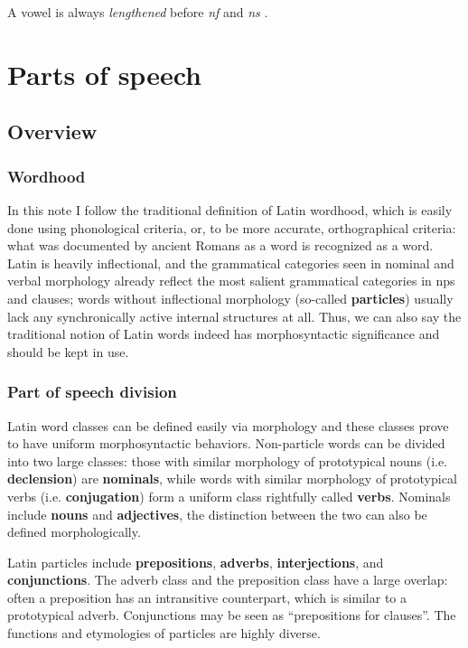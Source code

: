 \documentclass[a4paper, oneside, 12pt]{report}
\newcommand*{\citepage}[1]{p.~{#1}}
\newcommand*{\concept}[1]{\textbf{#1}}
\newcommand{\form}[1]{\emph{#1}}
\begin{document}
A vowel is always \emph{lengthened} before \form{nf} and \form{ns}
\citep[\citepage{55}]{oniga2014latin}.

\chapter{Parts of speech}\label{chap:pos}

\section{Overview}

\subsection{Wordhood}

In this note I follow the traditional definition of Latin wordhood,
which is easily done using phonological criteria,
or, to be more accurate, orthographical criteria: 
what was documented by ancient Romans as a word 
is recognized as a word.
Latin is heavily inflectional,
and the grammatical categories seen in nominal and verbal morphology 
already reflect the most salient grammatical categories
in \acs{np}s and clauses;
words without inflectional morphology (so-called \concept{particles}) 
usually lack any synchronically active internal structures at all.
Thus, we can also say the traditional notion of Latin words 
indeed has morphosyntactic significance
and should be kept in use.

\subsection{Part of speech division}

Latin word classes can be defined easily via morphology
and these classes prove to have uniform morphosyntactic behaviors.
Non-particle words can be divided into two large classes:
those with similar morphology of prototypical nouns (i.e. \concept{declension}) are \concept{nominals},
while words with similar morphology of prototypical verbs (i.e. \concept{conjugation})
form a uniform class rightfully called \concept{verbs}.
Nominals include \concept{nouns} and \concept{adjectives},
the distinction between the two can also be defined morphologically.

Latin particles include \concept{prepositions}, \concept{adverbs},
\concept{interjections}, and \concept{conjunctions}.
The adverb class and the preposition class have a large overlap:
often a preposition has an intransitive counterpart,
which is similar to a prototypical adverb.
Conjunctions may be seen as ``prepositions for clauses''.
The functions and etymologies of particles are highly diverse.
\end{document}
